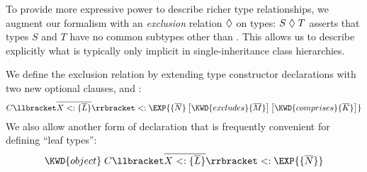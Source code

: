 To provide more expressive power to describe richer type relationships,
we augment our formalism with an \emph{exclusion} relation $\mathrel{\lozenge}$ on types:
$S \mathrel{\lozenge} T$ asserts that types $S$ and $T$ have no common subtypes other than \BottomType.
This allows us to describe explicitly what is typically only implicit in single-inheritance
class hierarchies.

We define the exclusion relation by extending type constructor declarations with
two new optional clauses,  and :
\[
C\tplist{X}{L} \extends \EXP{\lbrace\bar{N}\rbrace\, \bigl[\KWD{excludes} \lbrace\bar{M}\rbrace\bigr]\, \bigl[\KWD{comprises} \lbrace\bar{K}\rbrace\bigr]}
\]
We also allow another form of declaration that is frequently convenient for defining ``leaf types'':
\[
\KWD{object} \; C\tplist{X}{L} \extends \EXP{\lbrace\bar{N}\rbrace}
\]

